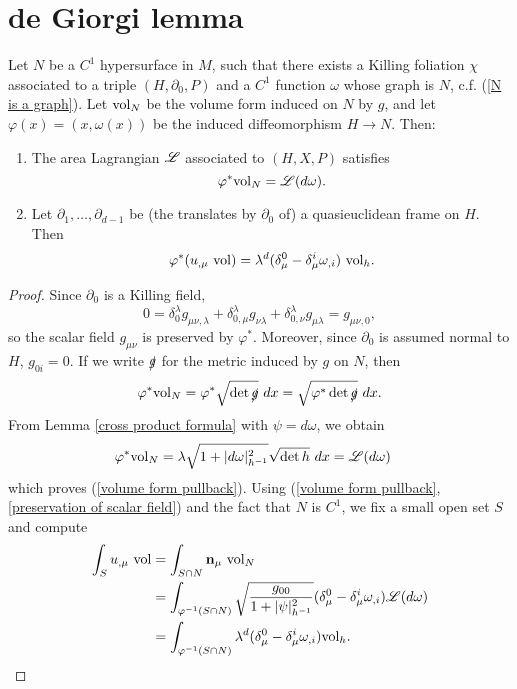 \section{de Giorgi lemma}



\begin{lemma}\label{volume form is Lagrangian}
Let $N$ be a $C^1$ hypersurface in $M$, such that there exists a Killing foliation $\chi$ associated to a triple $(H, \partial_0, P)$ and a $C^1$ function $\omega$ whose graph is $N$, c.f. (\ref{N is a graph}).
Let $\mathrm{vol}_N$ be the volume form induced on $N$ by $g$, and let $\varphi(x) = (x, \omega(x))$ be the induced diffeomorphism $H \to N$.
Then:
\begin{enumerate}
\item The area Lagrangian $\mathscr L$ associated to $(H, X, P)$ satisfies
\begin{equation}\label{volume form pullback}
\varphi^* \mathrm{vol}_N = \mathscr L(d\omega).
\end{equation}
\item Let $\partial_1, \dots, \partial_{d - 1}$ be (the translates by $\partial_0$ of) a quasieuclidean frame on $H$. Then
$$\varphi^*(u_{,\mu} ~\mathrm{vol}) = \lambda^d (\delta_\mu^0 - \delta^i_\mu \omega_{,i}) ~\mathrm{vol}_h.$$
\end{enumerate}
\end{lemma}
\begin{proof}
Since $\partial_0$ is a Killing field,
\begin{equation}\label{preservation of scalar field}
0 = \delta^\lambda_0 g_{\mu \nu,\lambda} + \delta^\lambda_{0,\mu} g_{\nu\lambda} + \delta^\lambda_{0,\nu} g_{\mu \lambda} = g_{\mu\nu,0},
\end{equation}
so the scalar field $g_{\mu\nu}$ is preserved by $\varphi^*$.
Moreover, since $\partial_0$ is assumed normal to $H$, $g_{0i} = 0$.
If we write $\slashed g$ for the metric induced by $g$ on $N$, then
$$\varphi^* \mathrm{vol}_N = \varphi^* \sqrt{\det \slashed g} ~dx = \sqrt{\varphi^* \det \slashed g} ~dx.$$
From Lemma \ref{cross product formula} with $\psi = d\omega$, we obtain
\begin{align*}
\varphi^* \mathrm{vol}_N &= \lambda\sqrt{1 + |d\omega|_{h^{-1}}^2} \sqrt{\det h} ~dx = \mathscr L(d\omega)
\end{align*}
which proves (\ref{volume form pullback}).
Using (\ref{volume form pullback}, \ref{preservation of scalar field}) and the fact that $N$ is $C^1$, we fix a small open set $S$ and compute
\begin{align*}
\int_S u_{,\mu} ~\mathrm{vol} &= \int_{S \cap N} \mathbf n_\mu ~\mathrm{vol}_N \\
&= \int_{\varphi^{-1}(S \cap N)} \sqrt{\frac{g_{00}}{1 + |\psi|_{h^{-1}}^2}} (\delta_\mu^0 - \delta_\mu^i \omega_{,i})\mathscr L(d\omega) \\
&= \int_{\varphi^{-1}(S \cap N)} \lambda^d (\delta_\mu^0 - \delta_\mu^i \omega_{,i}) \mathrm{vol}_h \qedhere.
\end{align*}
\end{proof}


